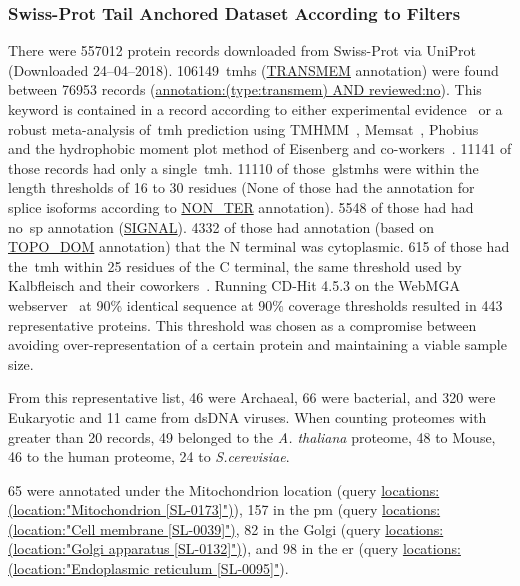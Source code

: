 \subsubsection{Swiss-Prot Tail Anchored Dataset According to Filters}
There were 557012 protein records downloaded from Swiss-Prot via UniProt~\cite{TheUniProtConsortium2014} (Downloaded 24--04--2018).
106149~\gls{tmh}s (\url{TRANSMEM} annotation) were found between 76953 records (\url{annotation:(type:transmem) AND reviewed:no}).
This keyword is contained in a record according to either experimental evidence~\cite{TheUniProtConsortium2014} or a robust meta-analysis of~\gls{tmh} prediction using TMHMM~\cite{Krogh2001}, Memsat~\cite{Jones2007}, Phobius~\cite{Kall2004,Kall2007} and the hydrophobic moment plot method of Eisenberg and co-workers~\cite{Eisenberg1984}.
11141 of those records had only a single~\gls{tmh}.
11110 of those~gls{tmh}s were within the length thresholds of 16 to 30 residues (None of those had the annotation for splice isoforms according to \url{NON_TER} annotation).
5548 of those had had no~\gls{sp} annotation (\url{SIGNAL}).
4332 of those had annotation (based on \url{TOPO_DOM} annotation) that the N terminal was cytoplasmic.
615 of those had the~\gls{tmh} within 25 residues of the C terminal, the same threshold used by Kalbfleisch and their coworkers~\cite{Kalbfleisch2007}.
Running CD-Hit 4.5.3 on the WebMGA webserver~\cite{Huang2010, Wu2011} at 90\% identical sequence at 90\% coverage thresholds resulted in 443 representative proteins.
This threshold was chosen as a compromise between avoiding over-representation of a certain protein and maintaining a viable sample size.

From this representative list, 46 were Archaeal, 66 were bacterial, and 320 were Eukaryotic and 11 came from dsDNA viruses.
When counting proteomes with greater than 20 records, 49 belonged to the \textit{A. thaliana} proteome, 48 to Mouse, 46 to the human proteome, 24 to \textit{S.cerevisiae}. %

65 were annotated under the Mitochondrion location (query \url{locations:(location:"Mitochondrion [SL-0173]")}), 157 in the \gls{pm} (query \url{locations:(location:"Cell membrane [SL-0039]")}, 82 in the Golgi (query \url{locations:(location:"Golgi apparatus [SL-0132]")}), and 98 in the \gls{er} (query \url{locations:(location:"Endoplasmic reticulum [SL-0095]"}).

